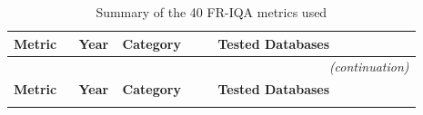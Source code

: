 \begin{longtable}{
p{0.15\linewidth}  %
p{0.05\linewidth}  %
p{0.22\linewidth}  %
p{0.47\linewidth}  %
}
    \caption{Summary of the 40 \acs{FR-IQA} metrics used}\label{tab:fr_iqa_metrics}\\
    \hline %
    \textbf{Metric} & \textbf{Year} & \textbf{Category} & \textbf{Tested Databases} \\ %
    \hline %
    \endfirsthead %
    \multicolumn{4}{r}{\small\itshape(continuation)}\\ %
    \hline %
    \textbf{Metric} & \textbf{Year} & \textbf{Category} & \textbf{Tested Databases} \\ %
    \hline %
    \endhead %
    \hline %
    \endfoot %


\end{longtable}
